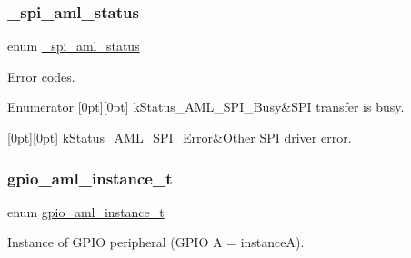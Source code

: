 \subsubsection{\texorpdfstring{\_spi\_aml\_status}{\_spi\_aml\_status}}
{\footnotesize\ttfamily enum \mbox{\hyperlink{group__enum__group_ga7eabcde60f10dd4e678bfafb2c66e618}{\+\_\+spi\+\_\+aml\+\_\+status}}}



Error codes. 

\begin{DoxyEnumFields}{Enumerator}
[0pt][0pt]{}\mbox{\label{group__enum__group_gga7eabcde60f10dd4e678bfafb2c66e618aee97661a5080945d517bb59648de934e}} 
k\+Status\+\_\+\+A\+M\+L\+\_\+\+S\+P\+I\+\_\+\+Busy&S\+PI transfer is busy. \\
\hline

[0pt][0pt]{}\mbox{\label{group__enum__group_gga7eabcde60f10dd4e678bfafb2c66e618ab50871cf42253a19dd8ccc1de1561dd7}} 
k\+Status\+\_\+\+A\+M\+L\+\_\+\+S\+P\+I\+\_\+\+Error&Other S\+PI driver error. \\
\hline

\end{DoxyEnumFields}
\mbox{\label{group__enum__group_ga325a66c5aefcf2c26cd0234c7e4bb0ef}} 
\subsubsection{\texorpdfstring{gpio\_aml\_instance\_t}{gpio\_aml\_instance\_t}}
{\footnotesize\ttfamily enum \mbox{\hyperlink{group__enum__group_ga325a66c5aefcf2c26cd0234c7e4bb0ef}{gpio\+\_\+aml\+\_\+instance\+\_\+t}}}



Instance of G\+P\+IO peripheral (G\+P\+IO A = instanceA). 

